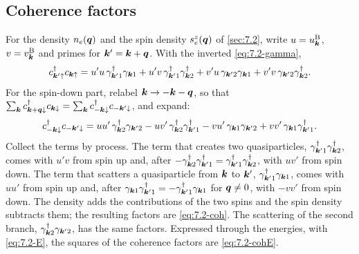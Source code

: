 \subsection*{Coherence factors}

For the density $n_e(\bm{q})$ and the spin density $s^z_e(\bm{q})$ of \cref{sec:7.2}, write $u = u^{\mathrm{B}}_{\bm{k}}$, $v = v^{\mathrm{B}}_{\bm{k}}$ and primes for $\bm{k}' = \bm{k} + \bm{q}$. With the inverted \cref{eq:7.2-gamma},
\begin{equation*}
  c^\dagger_{\bm{k}'\uparrow}c_{\bm{k}\uparrow} = u'u\,\gamma^\dagger_{\bm{k}'1}\gamma_{\bm{k}1} + u'v\,\gamma^\dagger_{\bm{k}'1}\gamma^\dagger_{\bm{k}2} + v'u\,\gamma_{\bm{k}'2}\gamma_{\bm{k}1} + v'v\,\gamma_{\bm{k}'2}\gamma^\dagger_{\bm{k}2} .
\end{equation*}
For the spin-down part, relabel $\bm{k} \to -\bm{k} - \bm{q}$, so that $\sum_{\bm{k}}c^\dagger_{\bm{k}+\bm{q}\downarrow}c_{\bm{k}\downarrow} = \sum_{\bm{k}}c^\dagger_{-\bm{k}\downarrow}c_{-\bm{k}'\downarrow}$, and expand:
\begin{equation*}
  c^\dagger_{-\bm{k}\downarrow}c_{-\bm{k}'\downarrow} = uu'\,\gamma^\dagger_{\bm{k}2}\gamma_{\bm{k}'2} - uv'\,\gamma^\dagger_{\bm{k}2}\gamma^\dagger_{\bm{k}'1} - vu'\,\gamma_{\bm{k}1}\gamma_{\bm{k}'2} + vv'\,\gamma_{\bm{k}1}\gamma^\dagger_{\bm{k}'1} .
\end{equation*}
Collect the terms by process. The term that creates two quasiparticles, $\gamma^\dagger_{\bm{k}'1}\gamma^\dagger_{\bm{k}2}$, comes with $u'v$ from spin up and, after $-\gamma^\dagger_{\bm{k}2}\gamma^\dagger_{\bm{k}'1} = \gamma^\dagger_{\bm{k}'1}\gamma^\dagger_{\bm{k}2}$, with $uv'$ from spin down. The term that scatters a quasiparticle from $\bm{k}$ to $\bm{k}'$, $\gamma^\dagger_{\bm{k}'1}\gamma_{\bm{k}1}$, comes with $uu'$ from spin up and, after $\gamma_{\bm{k}1}\gamma^\dagger_{\bm{k}'1} = -\gamma^\dagger_{\bm{k}'1}\gamma_{\bm{k}1}$ for $\bm{q} \ne 0$, with $-vv'$ from spin down. The density adds the contributions of the two spins and the spin density subtracts them; the resulting factors are \cref{eq:7.2-coh}. The scattering of the second branch, $\gamma^\dagger_{\bm{k}2}\gamma_{\bm{k}'2}$, has the same factors. Expressed through the energies, with \cref{eq:7.2-E}, the squares of the coherence factors are \cref{eq:7.2-cohE}.
